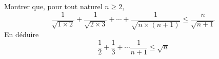 Montrer que, pour tout naturel $n\geq 2$,
\begin{displaymath}
 \frac{1}{\sqrt{1\times 2}} + \frac{1}{\sqrt{2\times 3}} + \cdots + \frac{1}{\sqrt{n\times (n+1)}} \leq \frac{n}{\sqrt{n+1}} 
\end{displaymath}
En déduire
\begin{displaymath}
 \frac{1}{2}+\frac{1}{3}+\cdots \frac{1}{n+1} \leq \sqrt{n}
\end{displaymath}
